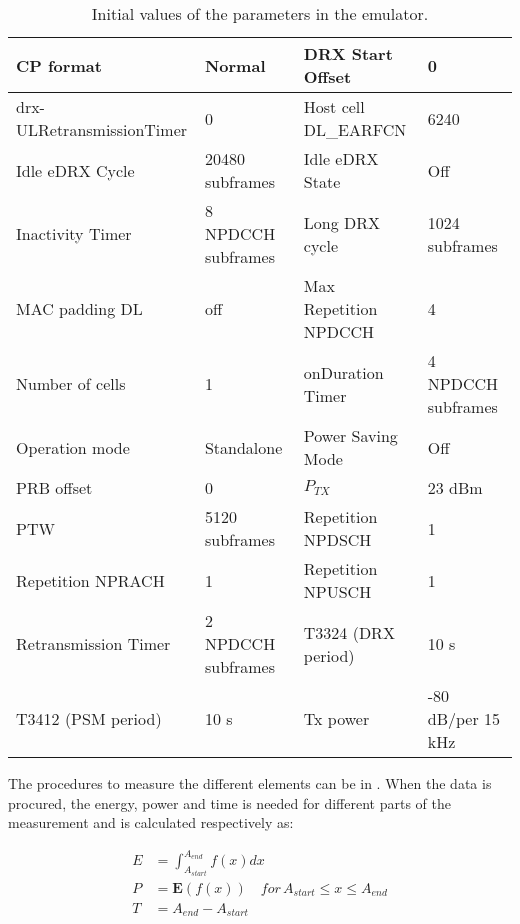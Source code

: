 \begin{table}[H]
{\begin{tabular}{|p{5cm}|p{3cm}|p{4cm}|p{3cm}|}
CP format                 & Normal   & DRX Start Offset           & 0              \\ \hline
drx-ULRetransmissionTimer & 0        & Host cell DL\_EARFCN     & 6240           \\ \hline
Idle eDRX Cycle     & 20480 subframes& Idle eDRX State            & Off            \\ \hline
Inactivity Timer        & 8 NPDCCH subframes & Long DRX cycle   & 1024 subframes \\ \hline
MAC padding DL           & off       & Max Repetition NPDCCH     & 4              \\ \hline
Number of cells          & 1         & onDuration Timer         & 4 NPDCCH subframes \\ \hline
Operation mode           & Standalone& Power Saving Mode        & Off            \\ \hline
PRB offset               & 0         &$P_{TX}$                  & 23 dBm         \\ \hline
\gls{PTW}                & 5120 subframes & Repetition NPDSCH   & 1              \\ \hline
Repetition NPRACH        & 1         & Repetition NPUSCH        & 1              \\ \hline
Retransmission Timer & 2 NPDCCH subframes & T3324 (DRX period)  & 10 s           \\ \hline
T3412 (PSM period)      & 10 s       & Tx power                 & -80 dB/per 15 kHz \\ \hline
\end{tabular}}
\caption{Initial values of the parameters in the emulator.}
\label{tab:setup_parameters}
\end{table}

The procedures to measure the different elements can be in . When the data is procured, the energy, power and time is needed for different parts of the measurement and is calculated respectively as:

\begin{align}
E &= \int_{A_{start}}^{A_{end}} f(x) dx \label{eq:energy}\\
P &= \mathbf{E}(f(x)) \quad for \, A_{start} \leq x \leq A_{end} \label{eq:power} \\
T &=  A_{end} - A_{start} \label{eq:time}\\
\end{align}
\begin{where}
\end{where}

